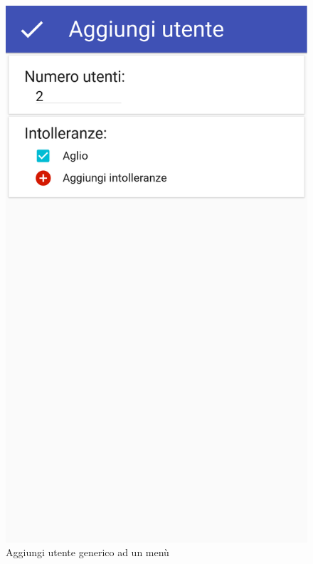 \begin{figure}[H]
	\begin{minipage}{.49\textwidth}
		\includegraphics[width=\textwidth]{img/wireframe/aggiungi_utente_generico_ok.png}
		\caption{Aggiungi utente generico ad un menù}
	\end{minipage}
	\hfill
	\begin{minipage}{.49\textwidth}

\end{minipage}
\end{figure}
